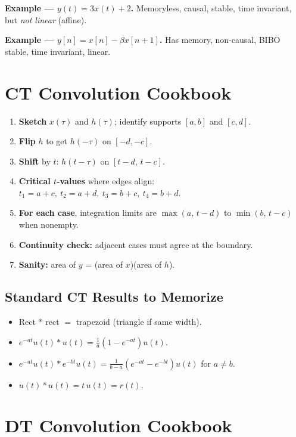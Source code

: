 \documentclass[11pt]{article}
\begin{document}
\textbf{Example --- $y(t) = 3x(t) + 2$.}
Memoryless, causal, stable, time invariant, but \emph{not linear} (affine).

\textbf{Example --- $y[n] = x[n] - \beta x[n+1]$.}
Has memory, non-causal, BIBO stable, time invariant, linear.

\section{CT Convolution Cookbook}

\begin{enumerate}
    \item \textbf{Sketch} $x(\tau)$ and $h(\tau)$; identify supports $[a,b]$ and $[c,d]$.
    \item \textbf{Flip} $h$ to get $h(-\tau)$ on $[-d,-c]$.
    \item \textbf{Shift} by $t$: $h(t-\tau)$ on $[t-d,\,t-c]$.
    \item \textbf{Critical $t$-values} where edges align:
    $t_1 = a+c,\ t_2 = a+d,\ t_3 = b+c,\ t_4 = b+d$.
    \item \textbf{For each case}, integration limits are $\max(a,\,t-d)$ to $\min(b,\,t-c)$ when nonempty.
    \item \textbf{Continuity check:} adjacent cases must agree at the boundary.
    \item \textbf{Sanity:} area of $y$ = (area of $x$)(area of $h$).
\end{enumerate}

\subsection*{Standard CT Results to Memorize}
\begin{itemize}[leftmargin=*]
    \item Rect $\ast$ rect $=$ trapezoid (triangle if same width).
    \item $e^{-at}u(t) \ast u(t) = \tfrac{1}{a}(1-e^{-at})u(t)$.
    \item $e^{-at}u(t) \ast e^{-bt}u(t) = \tfrac{1}{b-a}(e^{-at} - e^{-bt})u(t)$ for $a\neq b$.
    \item $u(t) \ast u(t) = t\,u(t) = r(t)$.
\end{itemize}

\section{DT Convolution Cookbook}
\end{document}
